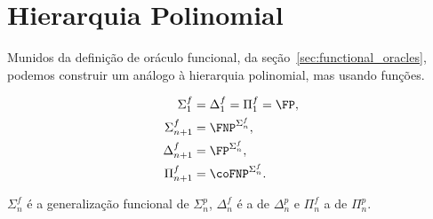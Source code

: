 \section{Hierarquia Polinomial}

Munidos da definição de oráculo funcional,
da seção~\ref{sec:functional_oracles},
podemos construir um análogo à hierarquia polinomial,
mas usando funções.

\begin{definition}
    \begin{align*}
        \Sigma_1^f &= \Delta_1^f = \Pi_1^f = \FP, \\
        \Sigma_{n+1}^f &= \FNP^{\Sigma_n^f}, \\
        \Delta_{n+1}^f &= \FP^{\Sigma_n^f}, \\
        \Pi_{n+1}^f &= \coFNP^{\Sigma_n^f}.
    \end{align*}
\end{definition}

$\Sigma_n^f$ é a generalização funcional de $\Sigma_n^p$,
$\Delta_n^f$ é a de $\Delta_n^p$
e $\Pi_n^f$ a de $\Pi_n^p$.
